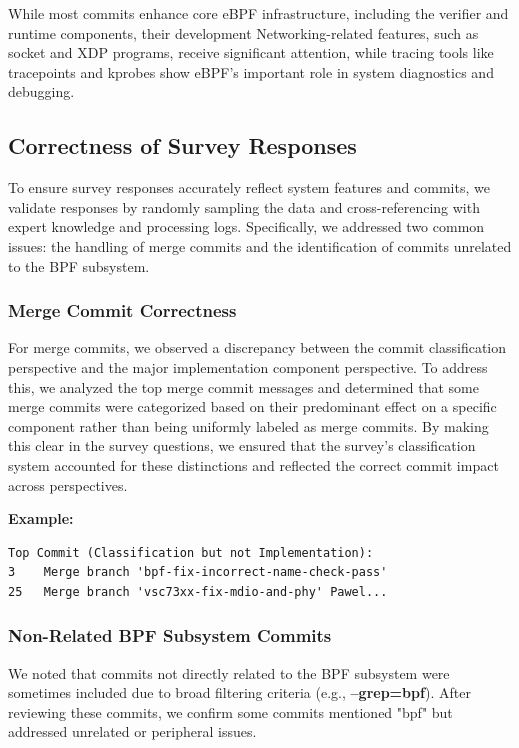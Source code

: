 While most commits enhance core eBPF infrastructure, including the verifier and runtime components, their development 
Networking-related features, such as socket and XDP programs, receive significant attention, while tracing tools like tracepoints and kprobes show eBPF's important role in system diagnostics and debugging.

\subsection{Correctness of Survey Responses}

To ensure survey responses accurately reflect system features and commits, we validate responses by randomly sampling the data and cross-referencing with expert knowledge and processing logs. Specifically, we addressed two common issues: the handling of merge commits and the identification of commits unrelated to the BPF subsystem.

\subsubsection{Merge Commit Correctness}

For merge commits, we observed a discrepancy between the commit classification perspective and the major implementation component perspective.  To address this, we analyzed the top merge commit messages and determined that some merge commits were categorized based on their predominant effect on a specific component rather than being uniformly labeled as merge commits. By making this clear in the survey questions, we ensured that the survey's classification system accounted for these distinctions and reflected the correct commit impact across perspectives.

\textbf{Example:}
\begin{verbatim}
Top Commit (Classification but not Implementation):
3    Merge branch 'bpf-fix-incorrect-name-check-pass'
25   Merge branch 'vsc73xx-fix-mdio-and-phy' Pawel...
\end{verbatim}

\subsubsection{Non-Related BPF Subsystem Commits}

We noted that commits not directly related to the BPF subsystem were sometimes included due to broad filtering criteria (e.g., \textbf{--grep=bpf}). After reviewing these commits, we confirm some commits mentioned "bpf" but addressed unrelated or peripheral issues.

